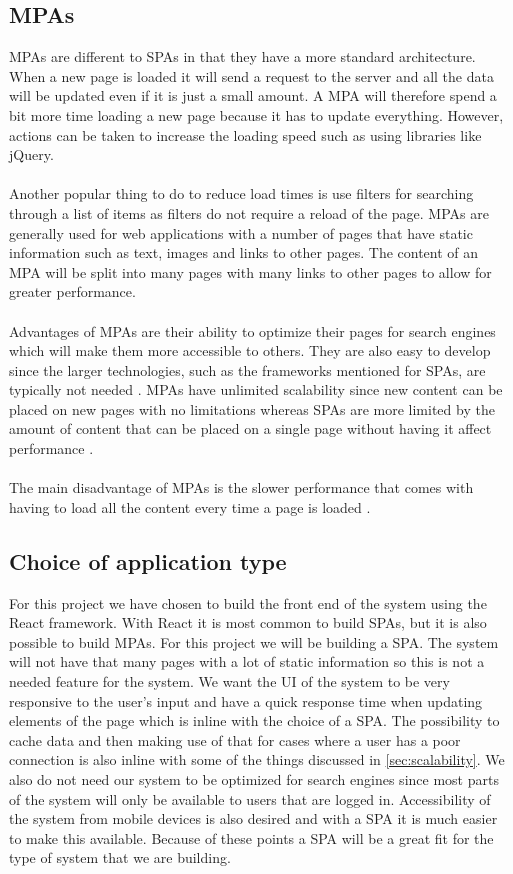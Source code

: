 \subsection{MPAs}
MPAs are different to SPAs in that they have a more standard architecture.
When a new page is loaded it will send a request to the server and all the data will be updated even if it is just a small amount.
A MPA will therefore spend a bit more time loading a new page because it has to update everything.
However, actions can be taken to increase the loading speed such as using libraries like jQuery.
\\\\
Another popular thing to do to reduce load times is use filters for searching through a list of items as filters do not require a reload of the page.
MPAs are generally used for web applications with a number of pages that have static information such as text, images and links to other pages.
The content of an MPA will be split into many pages with many links to other pages to allow for greater performance.
\\\\
Advantages of MPAs are their ability to optimize their pages for search engines which will make them more accessible to others. 
They are also easy to develop since the larger technologies, such as the frameworks mentioned for SPAs, are typically not needed \cite{SPAvsMPAMerehead}.
MPAs have unlimited scalability since new content can be placed on new pages with no limitations whereas SPAs are more limited by the amount of content that can be placed on a single page without having it affect performance \cite{SPAvsMPARuby}.
\\\\
The main disadvantage of MPAs is the slower performance that comes with having to load all the content every time a page is loaded \cite{SPAvsMPARuby}.

\subsection{Choice of application type}
For this project we have chosen to build the front end of the system using the React framework. 
With React it is most common to build SPAs, but it is also possible to build MPAs. 
For this project we will be building a SPA.
The system will not have that many pages with a lot of static information so this is not a needed feature for the system.
We want the UI of the system to be very responsive to the user's input and have a quick response time when updating elements of the page which is inline with the choice of a SPA.
The possibility to cache data and then making use of that for cases where a user has a poor connection is also inline with some of the things discussed in \autoref{sec:scalability}.
We also do not need our system to be optimized for search engines since most parts of the system will only be available to users that are logged in.
Accessibility of the system from mobile devices is also desired and with a SPA it is much easier to make this available. 
Because of these points a SPA will be a great fit for the type of system that we are building.
